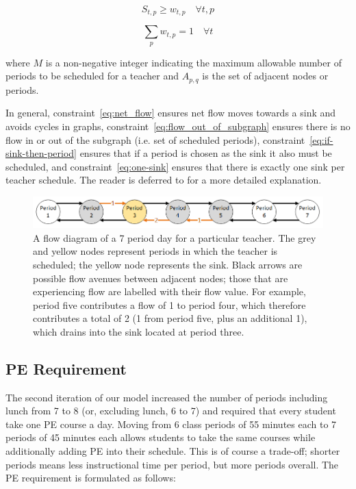 \documentclass[12pt]{article}
\begin{document}
\begin{equation} \label{eq:if-sink-then-period}
	S_{t,p} \geq w_{t,p} \quad \forall t,p
\end{equation}

\begin{equation} \label{eq:one-sink}
	\displaystyle\sum_{p} w_{t,p} = 1 \quad \forall t
\end{equation}

where $M$ is a non-negative integer indicating the maximum allowable number of periods to be scheduled for a teacher and $A_{p,q}$ is the set of adjacent nodes or periods.

In general, constraint~\ref{eq:net_flow} ensures net flow moves towards a sink and avoids cycles in graphs, constraint~\ref{eq:flow_out_of_subgraph} ensures there is no flow in or out of the subgraph (i.e. set of scheduled periods), constraint~\ref{eq:if-sink-then-period} ensures that if a period is chosen as the sink it also must be scheduled, and constraint~\ref{eq:one-sink} ensures that there is exactly one sink per teacher schedule. The reader is deferred to \cite{shirabe} for a more detailed explanation.

\begin{figure}
	\includegraphics[width=\linewidth]{./flow_diagram}
	\caption{A flow diagram of a 7 period day for a particular teacher. The grey and yellow nodes represent periods in which the teacher is scheduled; the yellow node represents the sink. Black arrows are possible flow avenues between adjacent nodes; those that are experiencing flow are labelled with their flow value. For example, period five contributes a flow of 1 to period four, which therefore contributes a total of 2 (1 from period five, plus an additional 1), which drains into the sink located at period three.}
	\label{fig:flow-diagram}
\end{figure}

\subsection{PE Requirement}

The second iteration of our model increased the number of periods including lunch from 7 to 8 (or, excluding lunch, 6 to 7) and required that every student take one PE course a day. Moving from 6 class periods of 55 minutes each to 7 periods of 45 minutes each allows students to take the same courses while additionally adding PE into their schedule. This is of course a trade-off;  shorter periods means less instructional time per period, but more periods overall. The PE requirement is formulated as follows:
\end{document}
